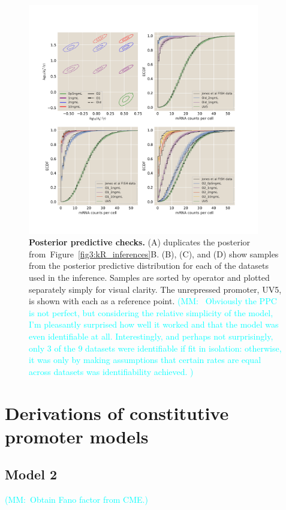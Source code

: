 \documentclass[12pt]{article}%
\newcommand{\mmnote}[1]{\textcolor{cyan}{(MM:~#1)}}
\newcommand{\fig}[1]{Figure~\ref{#1}}
\begin{document}
\begin{figure}%
\centering
\includegraphics[width=0.9\textwidth]{../figures/figSIxx/ppc_many_pooled.pdf}
\caption{\textbf{Posterior predictive checks.}
(A) duplicates the posterior from~\fig{fig3:kR_inferences}B.
(B), (C), and (D) show samples from the posterior predictive distribution
for each of the datasets used in the inference.
Samples are sorted by operator and plotted separately simply for visual clarity.
The unrepressed promoter, UV5, is shown with each as a reference point.
\mmnote{
Obviously the PPC is not perfect,
but considering the relative simplicity of the model, I'm pleasantly surprised
how well it worked and that the model was even identifiable at all.
Interestingly, and perhaps not surprisingly, only 3 of the 9 datasets
were identifiable if fit in isolation: otherwise,
it was only by making assumptions that certain rates are equal
across datasets was identifiability achieved.
}
    }
\label{fig4:ppc}
\end{figure}

\appendix

\section{Derivations of constitutive promoter models}
\subsection{Model 2}
\mmnote{Obtain Fano factor from CME.}
\end{document}

